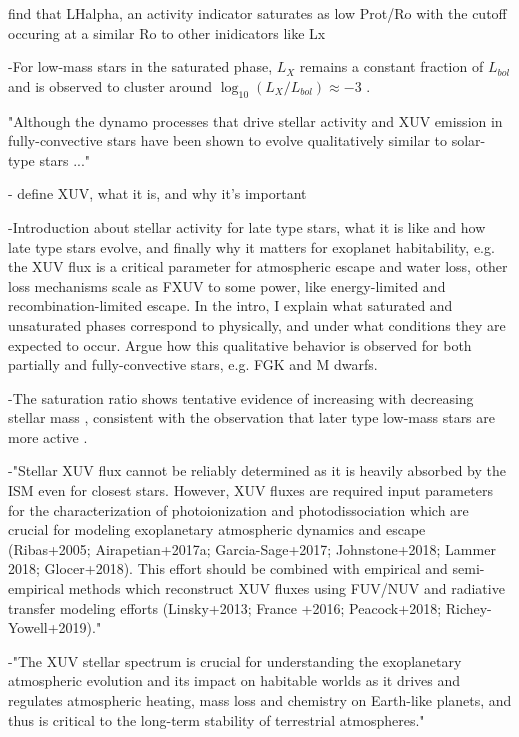 \documentclass[twocolumn]{aastex62}
\begin{document}
\citet{Newton2017} find that LHalpha, an activity indicator saturates as low Prot/Ro with the cutoff occuring at a similar Ro to other inidicators like Lx

-For low-mass stars in the saturated phase, $L_{X}$ remains a constant fraction of $L_{bol}$ and is observed to cluster around $\log_{10}(L_X/L_{bol}) \approx -3$ \citep{Pizzolato2003,Wright2011,Wright2018}. 

"Although the dynamo processes that drive stellar activity and XUV emission in fully-convective stars have been shown to evolve qualitatively similar to solar-type stars \citep{Wright2016,Wright2018} ..."

- define XUV, what it is, and why it's important

-Introduction about stellar activity for late type stars, what it is like and how late type stars evolve, and finally why it matters for exoplanet habitability, e.g. the XUV flux is a critical parameter for atmospheric escape and water loss, other loss mechanisms scale as FXUV to some power, like energy-limited and recombination-limited escape. In the intro, I explain what saturated and unsaturated phases correspond to physically, and under what conditions they are expected to occur. Argue how this qualitative behavior is observed for both partially and fully-convective stars, e.g. FGK and M dwarfs.

-The saturation ratio shows tentative evidence of increasing with decreasing stellar mass \citep{Wright2011,Jackson2012}, consistent with the observation that later type low-mass stars are more active \citep[e.g.][]{West2008}. 

-"Stellar XUV flux cannot be reliably determined as it is heavily absorbed by the ISM
even for closest stars. However, XUV fluxes are required input parameters for the characterization
of photoionization and photodissociation which are crucial for modeling exoplanetary atmospheric
dynamics and escape (Ribas+2005; Airapetian+2017a; Garcia-Sage+2017; Johnstone+2018; 
Lammer 2018; Glocer+2018). This effort should be combined with empirical and semi-empirical
methods which reconstruct XUV fluxes using FUV/NUV and radiative transfer modeling efforts
(Linsky+2013; France +2016; Peacock+2018; Richey-Yowell+2019)."

-"The XUV stellar spectrum is crucial for understanding the
exoplanetary atmospheric evolution and its impact on habitable worlds as it drives and regulates
atmospheric heating, mass loss and chemistry on Earth-like planets, and thus is critical to the
long-term stability of terrestrial atmospheres."
\end{document}

